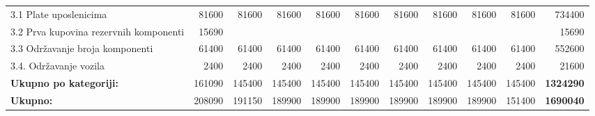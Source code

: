 \documentclass[12pt]{article}
\begin{document}
\begin{landscape}
\begin{table}[htbp]
\begin{tabular}{lrrrrrrrrrr}
    3.1 Plate uposlenicima & 81600 & 81600 & 81600 & 81600 & 81600 & 81600 & 81600 & 81600 & 81600 & 734400 \\
    \multicolumn{1}{p{14.715em}}{3.2 Prva kupovina rezervnih\newline{} komponenti} & 15690 &       &       &       &       &       &       &       &       & 15690 \\
    3.3 Održavanje broja komponenti & 61400 & 61400 & 61400 & 61400 & 61400 & 61400 & 61400 & 61400 & 61400 & 552600 \\
    3.4. Održavanje vozila & 2400  & 2400  & 2400  & 2400  & 2400  & 2400  & 2400  & 2400  & 2400  & 21600 \\
    \midrule
    \textbf{Ukupno po kategoriji:} & 161090 & 145400 & 145400 & 145400 & 145400 & 145400 & 145400 & 145400 & 145400 & \textbf{1324290} \\
    \midrule
    \textbf{Ukupno:} & 208090 & 191150 & 189900 & 189900 & 189900 & 189900 & 189900 & 189900 & 151400 & \textbf{1690040} \\
    \bottomrule
    \end{tabular}%
  \label{tab:addlabel}%
\end{table}%
\end{landscape}
\end{document}
